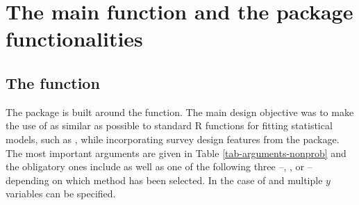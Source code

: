 \documentclass[
]{jss}
\begin{document}
\clearpage

\section{The main function and the package
functionalities}\label{sec-package}

\subsection[The nonprob function]{The  function}

The  package is built around the 
function. The main design objective was to make the use of
 as similar as possible to standard R functions for
fitting statistical models, such as , while
incorporating survey design features from the  package. The
most important arguments are given in Table \ref{tab-arguments-nonprob}
and the obligatory ones include  as well as one of the
following three --, , or  --
depending on which method has been selected. In the case of
 and  multiple \(y\) variables can be
specified.
\end{document}
